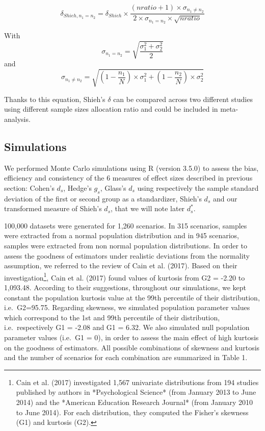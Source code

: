 \documentclass[man]{apa6}
\let\rmarkdownfootnote\footnote%
\def\footnote{\protect\rmarkdownfootnote}
\begin{document}
\begin{equation} 
\delta_{Shieh,n_1=n_2}= \delta_{Shieh} \times \frac{(nratio+1) \times \sigma_{n_1 \neq n_2}}{2 \times \sigma_{n_1=n_2} \times \sqrt{nratio}}
\label{eq:shiehvsbaldesign}
\end{equation}

With \[\sigma_{n_1=n_2}= \sqrt{\frac{\sigma_1^2+\sigma_2^2}{2}}\] and
\[\sigma_{n_1 \neq n_2} = \sqrt{(1- \frac{n_1}{N}) \times \sigma_1^2+(1- \frac{n_2}{N}) \times \sigma_2^2}\]

Thanks to this equation, Shieh's \(\delta\) can be compared across two different studies using different sample sizes allocation ratio and could be included in meta-analysis.

\hypertarget{simulations}{%
\subsection{Simulations}\label{simulations}}

We performed Monte Carlo simulations using R (version 3.5.0) to assess the bias, efficiency and consistency of the 6 measures of effect sizes described in previous section: Cohen's \(d_s\), Hedge's \(g_s\), Glass's \(d_s\) using respectively the sample standard deviation of the first or second group as a standardizer, Shieh's \(d_s\) and our transformed measure of Shieh's \(d_s\), that we will note later \(d_s^*\).

100,000 datasets were generated for 1,260 scenarios. In 315 scenarios, samples were extracted from a normal population distribution and in 945 scenarios, samples were extracted from non normal population distributions. In order to assess the goodness of estimators under realistic deviations from the normality assumption, we referred to the review of Cain et al. (2017). Based on their investigation\footnote{Cain et al. (2017) investigated 1,567 univariate distributions from 194 studies published by authors in *Psychological Science* (from January 2013 to June 2014) and the *American Education Research Journal* (from January 2010 to June 2014). For each distribution, they computed the Fisher's skewness (G1) and kurtosis (G2). }, Cain et al. (2017) found values of kurtosis from G2 = -2.20 to 1,093.48. According to their suggestions, throughout our simulations, we kept constant the population kurtosis value at the 99th percentile of their distribution, i.e.~G2=95.75. Regarding skewness, we simulated population parameter values which correspond to the 1st and 99th percentile of their distribution, i.e.~respectively G1 = -2.08 and G1 = 6.32. We also simulated null population parameter values (i.e.~G1 = 0), in order to assess the main effect of high kurtosis on the goodness of estimators. All possible combinations of skewness and kurtosis and the number of scenarios for each combination are summarized in Table 1.
\end{document}
